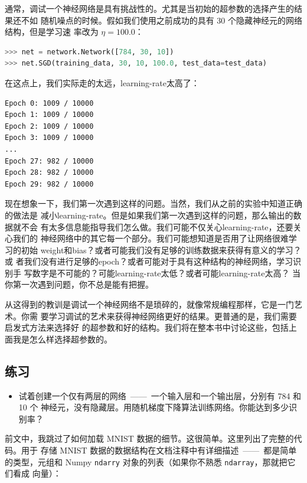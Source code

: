 通常，调试一个神经网络是具有挑战性的。尤其是当初始的超参数的选择产生的结果还不如
随机噪点的时候。假如我们使用之前成功的具有 30 个隐藏神经元的网络结构，但是学习速
率改为 $\eta = 100.0$：

\begin{lstlisting}[language=Python]
>>> net = network.Network([784, 30, 10])
>>> net.SGD(training_data, 30, 10, 100.0, test_data=test_data)
\end{lstlisting}

在这点上，我们实际走的太远，\gls*{learning-rate}太高了：

\begin{lstlisting}[language=sh]
Epoch 0: 1009 / 10000
Epoch 1: 1009 / 10000
Epoch 2: 1009 / 10000
Epoch 3: 1009 / 10000
...
Epoch 27: 982 / 10000
Epoch 28: 982 / 10000
Epoch 29: 982 / 10000
\end{lstlisting}

现在想象一下，我们第一次遇到这样的问题。当然，我们从之前的实验中知道正确的做法是
减小\gls*{learning-rate}。但是如果我们第一次遇到这样的问题，那么输出的数据就不会
有太多信息能指导我们怎么做。我们可能不仅关心\gls*{learning-rate}，还要关心我们的
神经网络中的其它每一个部分。我们可能想知道是否用了让网络很难学习的初始%
\gls*{weight}和\gls*{bias}？或者可能我们没有足够的训练数据来获得有意义的学习？或
者我们没有进行足够的\gls*{epoch}？或者可能对于具有这种结构的神经网络，学习识别手
写数字是不可能的？可能\gls*{learning-rate}太低？或者可能\gls*{learning-rate}太高？
当你第一次遇到问题，你不总是能有把握。

从这得到的教训是调试一个神经网络不是琐碎的，就像常规编程那样，它是一门艺术。你需
要学习调试的艺术来获得神经网络更好的结果。更普通的是，我们需要启发式方法来选择好
的超参数和好的结构。我们将在整本书中讨论这些，包括上面我是怎么样选择超参数的。

\subsection*{练习}

\begin{itemize}
\item 试着创建一个仅有两层的网络~——~一个输入层和一个输出层，分别有 784 和 10 个
  神经元，没有隐藏层。用随机梯度下降算法训练网络。你能达到多少识别率？
\end{itemize}

前文中，我跳过了如何加载 MNIST 数据的细节。这很简单。这里列出了完整的代码。用于
存储 MNIST 数据的数据结构在文档注释中有详细描述~——~都是简单的类型，元组和 Numpy
\lstinline!ndarry! 对象的列表（如果你不熟悉 \lstinline!ndarray!，那就把它们看成
  向量）：

